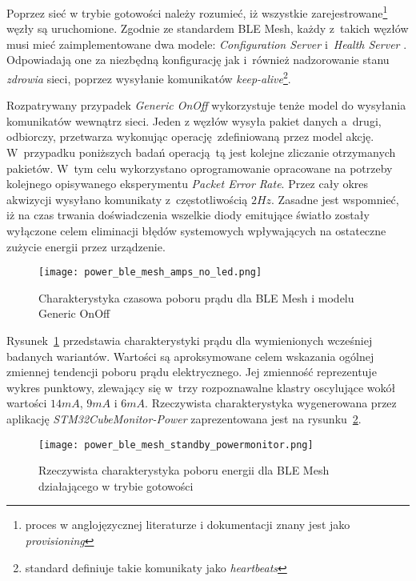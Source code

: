 Poprzez sieć w trybie gotowości należy rozumieć, iż wszystkie zarejestrowane\footnote{proces w anglojęzycznej literaturze i dokumentacji znany jest jako \textit{provisioning}}
węzły są uruchomione. Zgodnie ze standardem BLE Mesh, każdy z~takich węzłów musi mieć zaimplementowane dwa modele:
\textit{Configuration Server} i~\textit{Health Server} \cite{wooley_martin_bluetooth_2019}. 
Odpowiadają one za niezbędną konfigurację jak i~również nadzorowanie stanu \textit{zdrowia} sieci, poprzez wysyłanie 
komunikatów \textit{keep-alive}\footnote{standard definiuje takie komunikaty jako \textit{heartbeats}\cite{wooley_martin_bluetooth_2019}\cite{mesh_working_group_mesh_2019}}.

Rozpatrywany przypadek \textit{Generic OnOff} wykorzystuje tenże model do wysyłania komunikatów wewnątrz sieci.
Jeden z węzłów wysyła pakiet danych a~drugi, odbiorczy, przetwarza wykonując operację zdefiniowaną przez model akcję.
W~przypadku poniższych badań operacją tą jest kolejne zliczanie otrzymanych pakietów.
W~tym celu wykorzystano oprogramowanie opracowane na potrzeby kolejnego opisywanego eksperymentu \textit{Packet Error Rate}.
Przez cały okres akwizycji wysyłano komunikaty z~częstotliwością $2Hz$. Zasadne jest wspomnieć, iż na czas trwania doświadczenia wszelkie 
diody emitujące światło zostały wyłączone celem eliminacji błędów systemowych wpływających na ostateczne zużycie energii przez
urządzenie.

\begin{figure}[!ht]
	\centering \texttt{[image: power\_ble\_mesh\_amps\_no\_led.png]} 
	\caption{Charakterystyka czasowa poboru prądu dla BLE Mesh i modelu Generic OnOff}
	\label{rys:power_ble_mesh_amps}
\end{figure}


Rysunek~\ref{rys:power_ble_mesh_amps} przedstawia charakterystyki prądu dla wymienionych wcześniej badanych wariantów. Wartości są aproksymowane
celem wskazania ogólnej zmiennej tendencji poboru prądu elektrycznego. Jej zmienność reprezentuje wykres punktowy, zlewający się 
w~trzy rozpoznawalne klastry oscylujące wokół wartości $14mA$, $9mA$ i $6mA$. Rzeczywista charakterystyka wygenerowana przez
aplikację \textit{STM32CubeMonitor-Power} zaprezentowana jest na rysunku~\ref{rys:power_ble_mesh_standby_powermonitor}.

\begin{figure}[!ht]
	\centering \texttt{[image: power\_ble\_mesh\_standby\_powermonitor.png]} 
	\caption{Rzeczywista charakterystyka poboru energii dla BLE Mesh działającego w trybie gotowości}
	\label{rys:power_ble_mesh_standby_powermonitor}
\end{figure}


